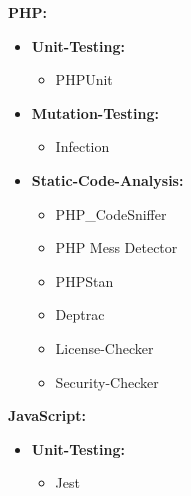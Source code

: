 {
    \begin{minipage}[t]{0.5\textwidth}
        \textbf{PHP:}

        \begin{itemize}
            \item {
                \textbf{Unit-Testing:}

                \begin{itemize}
                    \item { PHPUnit }
                \end{itemize}
            }

            \item {
                \textbf{Mutation-Testing:}

                \begin{itemize}
                    \item { Infection }
                \end{itemize}
            }

            \item {
                \textbf{Static-Code-Analysis:}

                \begin{itemize}
                    \item { PHP\_CodeSniffer }
                    \item { PHP Mess Detector }
                    \item { PHPStan }
                    \item { Deptrac }
                    \item { License-Checker }
                    \item { Security-Checker }
                \end{itemize}
            }
        \end{itemize}
    \end{minipage}%
    \begin{minipage}[t]{0.5\textwidth}
        \textbf{JavaScript:}

        \begin{itemize}
            \item {
                \textbf{Unit-Testing:}

                \begin{itemize}
                    \item { Jest }
                \end{itemize}
            }


\end{itemize}
\end{minipage}}
